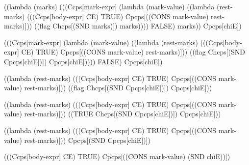 \begin{schemeblock}
\begin{schemedisplay}
((lambda (marks)
   (((Ccps[mark-expr]
          (lambda (mark-value) 
            ((lambda (rest-marks) 
               (((Ccps[body-expr] CE) TRUE) Cpcps[((CONS mark-value) rest-marks)]))
             ((flag Chcps[(SND marks)]) marks))))
     FALSE) marks))
 Cpcps[chiE])
\end{schemedisplay}
\end{schemeblock}

\begin{schemeblock}
\begin{schemedisplay}
(((Ccps[mark-expr]
       (lambda (mark-value) 
         ((lambda (rest-marks) 
            (((Ccps[body-expr] CE) TRUE) Cpcps[((CONS mark-value) rest-marks)]))
          ((flag Chcps[(SND Cpcps[chiE])]) Cpcps[chiE]))))
  FALSE) Cpcps[chiE])
\end{schemedisplay}
\end{schemeblock}

\begin{schemeblock}
\begin{schemedisplay}
((lambda (rest-marks) 
   (((Ccps[body-expr] CE) TRUE) Cpcps[((CONS mark-value) rest-marks)]))
 ((flag Chcps[(SND Cpcps[chiE])]) Cpcps[chiE]))
\end{schemedisplay}
\end{schemeblock}

\begin{schemeblock}
\begin{schemedisplay}
((lambda (rest-marks) 
   (((Ccps[body-expr] CE) TRUE) Cpcps[((CONS mark-value) rest-marks)]))
 ((TRUE Chcps[(SND Cpcps[chiE])]) Cpcps[chiE]))
\end{schemedisplay}
\end{schemeblock}

\begin{schemeblock}
\begin{schemedisplay}
((lambda (rest-marks) 
   (((Ccps[body-expr] CE) TRUE) Cpcps[((CONS mark-value) rest-marks)]))
 Cpcps[(SND Cpcps[chiE])])
\end{schemedisplay}
\end{schemeblock}

\begin{schemeblock}
\begin{schemedisplay}
(((Ccps[body-expr] CE) TRUE) Cpcps[((CONS mark-value) (SND chiE))])
\end{schemedisplay}
\end{schemeblock}

